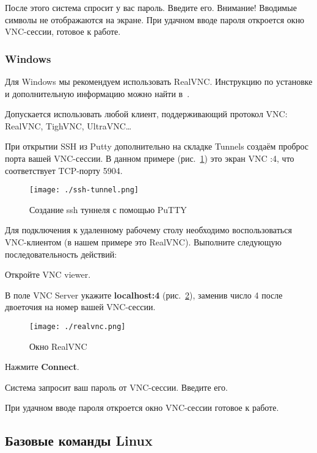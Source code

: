 После этого система спросит у вас пароль. Введите его. Внимание! Вводимые символы не отображаются на экране. При удачном вводе пароля откроется окно VNC-сессии, готовое к работе. 

\subsubsection{Windows}

Для Windows мы рекомендуем использовать RealVNC. Инструкцию по установке и дополнительную информацию можно найти в~\cite{RealVNC}.

Допускается использовать любой клиент, поддерживающий протокол VNC: RealVNC, TighVNC, UltraVNC\dots

При открытии SSH из Putty дополнительно на складке Tunnels создаём проброс порта вашей VNC-сессии. В данном примере (рис.~\ref{fig:ssh-tunnel}) это экран VNC :4, что соответствует TCP-порту 5904.

\begin{figure}[htb]
    \centering
    \texttt{[image: ./ssh-tunnel.png]}
    \caption{Создание ssh туннеля с помощью PuTTY}
    \label{fig:ssh-tunnel}
\end{figure}

Для подключения к удаленному рабочему столу необходимо воспользоваться VNC-клиентом (в нашем примере это RealVNC). Выполните следующую последовательность действий:

\begin{enumerate*}
    \item Откройте VNC viewer.
    \item В поле VNC Server укажите \textbf{localhost:4} (рис.~\ref{fig:realvnc}), заменив число 4 после двоеточия на номер вашей VNC-сессии.

\begin{figure}[htb]
    \centering
    \texttt{[image: ./realvnc.png]}
    \caption{Окно RealVNC}
    \label{fig:realvnc}
\end{figure}

    \item Нажмите \textbf{Connect}.
    \item Система запросит ваш пароль от VNC-сессии. Введите его.
    \item При удачном вводе пароля откроется окно VNC-сессии готовое к работе.
\end{enumerate*}

\subsection{Базовые команды Linux}

